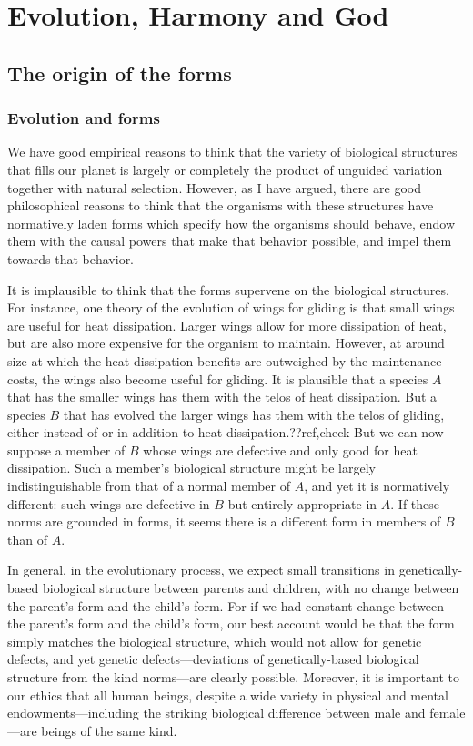 \def\mychapter{X}

\chapter{Evolution, Harmony and God}\label{ch:God}
\section{The origin of the forms}
\subsection{Evolution and forms}
We have good empirical reasons to think that the variety of biological structures that fills our planet 
is largely or completely the product of unguided variation together with natural selection. However, as
I have argued, there are good philosophical reasons to think that the organisms with these structures
have normatively laden forms which specify how the organisms should behave, endow them with the causal
powers that make that behavior possible, and impel them towards that behavior. 

It is implausible to think that the forms supervene on the biological structures. For instance, one theory
of the evolution of wings for gliding is that small wings are useful for heat dissipation. Larger wings allow
for more dissipation of heat, but are also more expensive for the organism to maintain. However, at around
size at which the heat-dissipation benefits are outweighed by the maintenance costs, the wings also become
useful for gliding. It is plausible that a species $A$ that has the smaller wings has them with the telos of
heat dissipation. But a species $B$ that has evolved the larger wings has them with the telos of gliding, either
instead of or in addition to heat dissipation.??ref,check But we can now suppose a member of $B$ whose wings are defective
and only good for heat dissipation. Such a member's biological structure might be largely indistinguishable from
that of a normal member of $A$, and yet it is normatively different: such wings are defective in $B$ but entirely
appropriate in $A$. If these norms are grounded in forms, it seems there is a different form in members of $B$ than
of $A$.

In general, in the evolutionary process, we expect small transitions in genetically-based biological structure 
between parents and children, with no change between the parent's form and the child's form. For if we had constant change
between the parent's form and the child's form, our best account would be that the form simply matches the
biological structure, which would not allow for genetic defects, and yet genetic defects---deviations of genetically-based
biological structure from the kind norms---are clearly possible.  Moreover, it is important to our ethics
that all human beings, despite a wide variety in physical and mental endowments---including the striking biological
difference between male and female---are beings of the same kind. 

